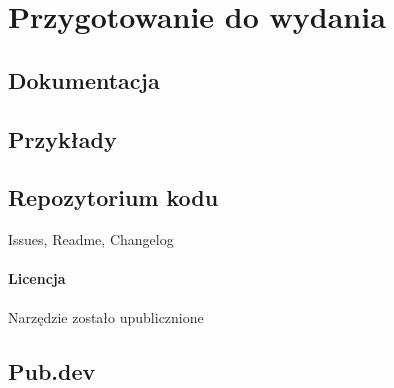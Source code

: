\section{Przygotowanie do wydania}

\subsection{Dokumentacja}
\subsection{Przykłady}
\subsection{Repozytorium kodu}
Issues, Readme, Changelog

\paragraph{Licencja}
Narzędzie zostało upublicznione \cite{RoundSpot_GitHub}

\subsection{Pub.dev}
